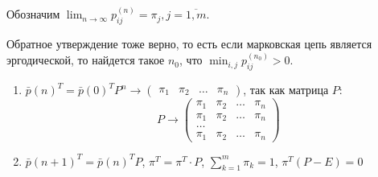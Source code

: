 Обозначим $\lim_{n\to\infty} p_{ij}^{(n)} = \pi_j, j = \overline{1, m}$. 

\begin{remark}
  Обратное утверждение тоже верно, то есть если марковская цепь является эргодической, то найдется
  такое $n_0$, что $\min_{i, j} p_{ij}^{(n_0)} > 0$.
\end{remark}

\begin{corollary}
  \begin{enumerate}
    \item $\bar{p} (n)^T = \bar{p}(0)^T P^n \to
      \begin{pmatrix} \pi_1 & \pi_2 & \dots & \pi_n \end{pmatrix}$, так как матрица $P$:
      \[
        P \to \begin{pmatrix}
          \pi_1 & \pi_2 & \dots & \pi_n \\
          \pi_1 & \pi_2 & \dots & \pi_n \\
          \dots \\
          \pi_1 & \pi_2 & \dots & \pi_n
        \end{pmatrix} 
      \]

    \item $\bar{p}(n+1)^T = \bar{p}(n)^T P$, $\pi^T = \pi^T \cdot P$, $\sum_{k=1}^m \pi_k = 1$, 
      $\pi^T (P - E) = 0$
  \end{enumerate}
\end{corollary}
